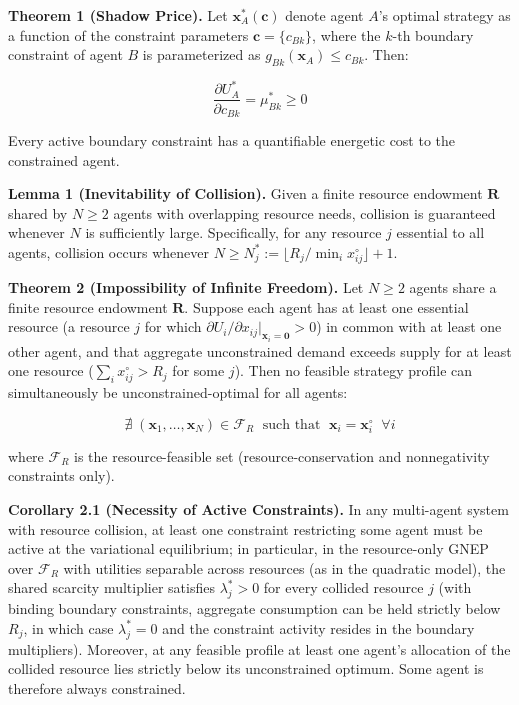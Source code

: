\documentclass[11pt]{article}
\begin{document}
\textbf{Theorem 1 (Shadow Price).} Let
\(\mathbf{x}_A^*(\boldsymbol{c})\) denote agent \(A\)'s optimal strategy
as a function of the constraint parameters
\(\boldsymbol{c} = \{c_{Bk}\}\), where the \(k\)-th boundary constraint
of agent \(B\) is parameterized as \(g_{Bk}(\mathbf{x}_A) \leq c_{Bk}\).
Then:

\[\frac{\partial U_A^*}{\partial c_{Bk}} = \mu_{Bk}^* \geq 0\]

Every active boundary constraint has a quantifiable energetic cost to
the constrained agent.

\textbf{Lemma 1 (Inevitability of Collision).} Given a finite resource
endowment \(\mathbf{R}\) shared by \(N \geq 2\) agents with overlapping
resource needs, collision is guaranteed whenever \(N\) is sufficiently
large. Specifically, for any resource \(j\) essential to all agents,
collision occurs whenever
\(N \geq N_j^* := \lfloor R_j / \min_i x_{ij}^{\circ} \rfloor + 1\).

\textbf{Theorem 2 (Impossibility of Infinite Freedom).} Let \(N \geq 2\)
agents share a finite resource endowment \(\mathbf{R}\). Suppose each
agent has at least one essential resource (a resource \(j\) for which
\(\partial U_i / \partial x_{ij} |_{\mathbf{x}_i = \mathbf{0}} > 0\)) in
common with at least one other agent, and that aggregate unconstrained
demand exceeds supply for at least one resource
(\(\sum_i x_{ij}^{\circ} > R_j\) for some \(j\)). Then no feasible
strategy profile can simultaneously be unconstrained-optimal for all
agents:

\[\nexists \; (\mathbf{x}_1, \ldots, \mathbf{x}_N) \in \mathcal{F}_R \; \text{ such that } \; \mathbf{x}_i = \mathbf{x}_i^{\circ} \;\; \forall i\]

where \(\mathcal{F}_R\) is the resource-feasible set
(resource-conservation and nonnegativity constraints only).

\textbf{Corollary 2.1 (Necessity of Active Constraints).} In any
multi-agent system with resource collision, at least one constraint
restricting some agent must be active at the variational equilibrium; in
particular, in the resource-only GNEP over \(\mathcal{F}_R\) with
utilities separable across resources (as in the quadratic model), the
shared scarcity multiplier satisfies \(\lambda_j^* > 0\) for every
collided resource \(j\) (with binding boundary constraints, aggregate
consumption can be held strictly below \(R_j\), in which case
\(\lambda_j^* = 0\) and the constraint activity resides in the boundary
multipliers). Moreover, at any feasible profile at least one agent's
allocation of the collided resource lies strictly below its
unconstrained optimum. Some agent is therefore always constrained.
\end{document}

